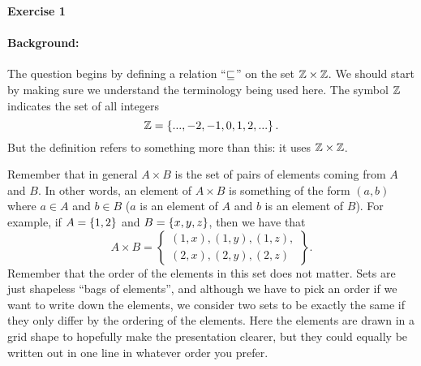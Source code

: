 \begin{center}\textbf{Exercise 1}\end{center}

\paragraph{Background:}
The question begins by defining a relation ``$\sqsubseteq$'' on the set $\mathbb{Z} \times \mathbb{Z}$. We should start by making sure we understand the terminology being used here. The symbol $\mathbb{Z}$ indicates the set of all integers
\[\mathbb{Z} = \left\{  ..., -2, -1, 0, 1, 2, ... \right\}.\]
But the definition refers to something more than this: it uses $\mathbb{Z} \times \mathbb{Z}$.

Remember that in general $A \times B$ is the set of pairs of elements coming from $A$ and $B$. In other words, an element of $A \times B$ is something of the form $(a, b)$ where $a \in A$ and $b \in B$ ($a$ is an element of $A$ and $b$ is an element of $B$).
For example, if $A = \left\{ 1, 2 \right\}$ and $B = \left\{ x, y, z \right\}$, then we have that
\[A \times B = 
\begin{Bmatrix}
	(1, x), (1, y), (1, z),\\
	(2, x), (2, y), (2, z)
\end{Bmatrix}.
\]
Remember that the order of the elements in this set does not matter. Sets are just shapeless ``bags of elements'', and although we have to pick an order if we want to write down the elements, we consider two sets to be exactly the same if they only differ by the ordering of the elements.
Here the elements are drawn in a grid shape to hopefully make the presentation clearer, but they could equally be written out in one line in whatever order you prefer.

